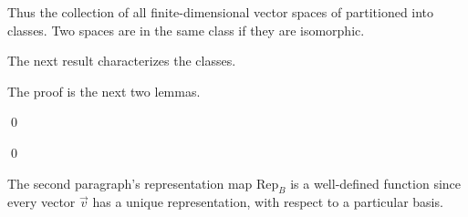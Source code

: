 \documentclass[10pt,t]{beamer}
\begin{document}
\begin{frame}
Thus the collection of all finite-dimensional vector spaces
of partitioned into classes.
Two spaces are in the same class if they are isomorphic.

The next result characterizes the classes.
\end{frame}




\begin{frame}
\th[th:NDimSpaceIsoRN]

\medskip
The proof is the next two lemmas.
\medskip

\pause
{}

\pause
\pf
{}
\end{frame}
\begin{frame}
\qed
\end{frame}




\begin{frame}

\pause
\pf
{}

\pause
{}
\end{frame}
\begin{frame}

\pause
{}
\end{frame}
\begin{frame}
\qed

\pause
\medskip
\no
The second paragraph's 
representation map $\text{Rep}_B$ is a well-defined function since
every vector $\vec{v}$ has a unique representation, with respect to
a particular basis.
\end{frame}
\end{document}

